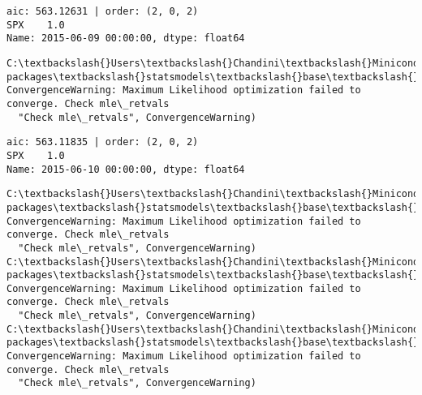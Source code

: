 \documentclass[11pt]{article}
\begin{document}
    \begin{Verbatim}[commandchars=\\\{\}]
aic: 563.12631 | order: (2, 0, 2)
SPX    1.0
Name: 2015-06-09 00:00:00, dtype: float64

    \end{Verbatim}

    \begin{Verbatim}[commandchars=\\\{\}]
C:\textbackslash{}Users\textbackslash{}Chandini\textbackslash{}Miniconda3\textbackslash{}envs\textbackslash{}auquan\textbackslash{}lib\textbackslash{}site-packages\textbackslash{}statsmodels\textbackslash{}base\textbackslash{}model.py:496: ConvergenceWarning: Maximum Likelihood optimization failed to converge. Check mle\_retvals
  "Check mle\_retvals", ConvergenceWarning)

    \end{Verbatim}

    \begin{Verbatim}[commandchars=\\\{\}]
aic: 563.11835 | order: (2, 0, 2)
SPX    1.0
Name: 2015-06-10 00:00:00, dtype: float64

    \end{Verbatim}

    \begin{Verbatim}[commandchars=\\\{\}]
C:\textbackslash{}Users\textbackslash{}Chandini\textbackslash{}Miniconda3\textbackslash{}envs\textbackslash{}auquan\textbackslash{}lib\textbackslash{}site-packages\textbackslash{}statsmodels\textbackslash{}base\textbackslash{}model.py:496: ConvergenceWarning: Maximum Likelihood optimization failed to converge. Check mle\_retvals
  "Check mle\_retvals", ConvergenceWarning)
C:\textbackslash{}Users\textbackslash{}Chandini\textbackslash{}Miniconda3\textbackslash{}envs\textbackslash{}auquan\textbackslash{}lib\textbackslash{}site-packages\textbackslash{}statsmodels\textbackslash{}base\textbackslash{}model.py:496: ConvergenceWarning: Maximum Likelihood optimization failed to converge. Check mle\_retvals
  "Check mle\_retvals", ConvergenceWarning)
C:\textbackslash{}Users\textbackslash{}Chandini\textbackslash{}Miniconda3\textbackslash{}envs\textbackslash{}auquan\textbackslash{}lib\textbackslash{}site-packages\textbackslash{}statsmodels\textbackslash{}base\textbackslash{}model.py:496: ConvergenceWarning: Maximum Likelihood optimization failed to converge. Check mle\_retvals
  "Check mle\_retvals", ConvergenceWarning)

    \end{Verbatim}
\end{document}
